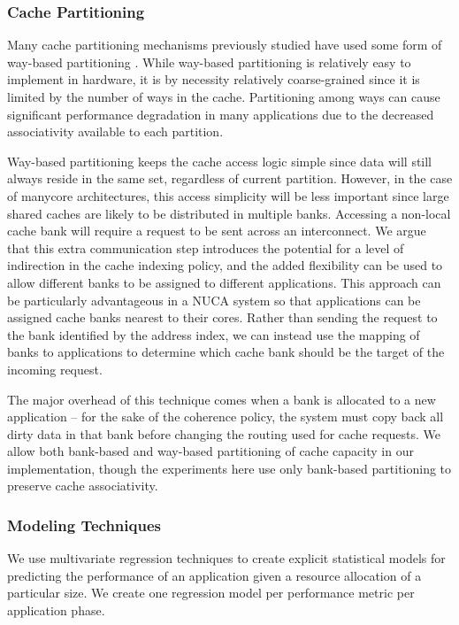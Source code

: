 \subsubsection*{Cache Partitioning}
Many cache partitioning mechanisms previously studied have used some form of way-based partitioning \cite{1331730,1152161,605420,1250671,1194855,1086328,1399982}.  While way-based partitioning is relatively easy to implement in hardware, it is by necessity relatively coarse-grained since it is limited by the number of ways in the cache.  Partitioning among ways can cause significant performance degradation in many applications due to the decreased associativity available to each partition.

Way-based partitioning keeps the cache access logic simple since data will still always reside in the same set, regardless of current partition.  However, in the case of manycore architectures, this access simplicity will be less important since large shared caches are likely to be distributed in multiple banks.  Accessing a non-local cache bank will require a request to be sent across an interconnect. We argue that this extra communication step introduces the potential for a level of indirection in the cache indexing policy, and the added flexibility can be used to allow different banks to be assigned to different applications. This approach can be particularly advantageous in a NUCA system so that applications can be assigned cache banks nearest to their cores. Rather than sending the request to the bank identified by the address index, we can instead use the mapping of banks to applications to determine which cache bank should be the target of the incoming request.

The major overhead of this technique comes when a bank is allocated to a new application -- for the sake of the coherence policy, the system must copy back all dirty data in that bank before changing the routing used for cache requests.  We allow both bank-based and way-based partitioning of cache capacity in our implementation, though the experiments here use only bank-based partitioning to preserve cache associativity.



\subsubsection*{Modeling Techniques}
We use multivariate regression techniques to create explicit statistical models for predicting the performance of an application given a resource allocation of a particular size.  We create one regression model per performance metric per application phase.


